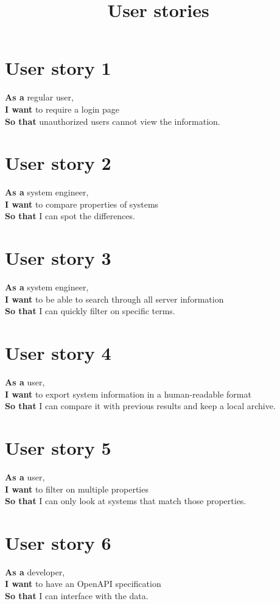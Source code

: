 \documentclass{article}
\title{User stories}
\date{}
\author{}
\begin{document}
\maketitle

\section{User story 1}
\textbf{As a} regular user,
\\\textbf{I want} to require a login page
\\\textbf{So that} unauthorized users cannot view the information.

\section{User story 2}
\textbf{As a} system engineer,
\\\textbf{I want} to compare properties of systems
\\\textbf{So that} I can spot the differences.

\section{User story 3}
\textbf{As a} system engineer,
\\\textbf{I want} to be able to search through all server information
\\\textbf{So that} I can quickly filter on specific terms.

\section{User story 4}
\textbf{As a} user,
\\\textbf{I want} to export system information in a human-readable format
\\\textbf{So that} I can compare it with previous results and keep a local archive.

\section{User story 5}
\textbf{As a} user,
\\\textbf{I want} to filter on multiple properties
\\\textbf{So that} I can only look at systems that match those properties.

\section{User story 6}
\textbf{As a} developer,
\\\textbf{I want} to have an OpenAPI specification
\\\textbf{So that} I can interface with the data.
\end{document}
